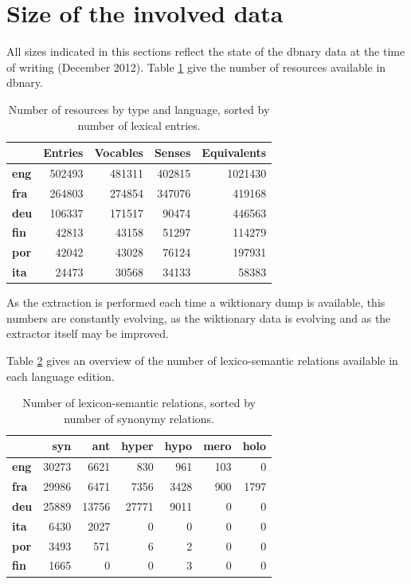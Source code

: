 \documentclass[sw]{iosart2c}
\begin{document}
\section{Size of the involved data}

All sizes indicated in this sections reflect the state of the dbnary data at the time of writing (December 2012). Table \ref{globalsize} give the number of resources available in dbnary.

\begin{table}[htb]
\begin{tabular}{lrrrr}
 & \textbf{Entries} & \textbf{Vocables} & \textbf{Senses} & \textbf{Equivalents}\\
 \hline
\textbf{eng} & 502493 & 481311 & 402815 & 1021430 \\
\textbf{fra} & 264803 & 274854 & 347076 & 419168 \\
\textbf{deu} & 106337 & 171517 & 90474 & 446563 \\
\textbf{fin} & 42813  & 43158 & 51297 & 114279 \\
\textbf{por} & 42042  & 43028 & 76124 & 197931 \\
\textbf{ita} & 24473  & 30568 & 34133 & 58383 \\
\end{tabular}
\caption{Number of resources by type and language, sorted by number of lexical entries.}\label{globalsize}
\end{table}

As the extraction is performed each time a wiktionary dump is available, this numbers are constantly evolving, as the wiktionary data is evolving and as the extractor itself may be improved.


Table \ref{nymsize} gives an overview of the number of lexico-semantic relations available in each language edition.

\begin{table}[htb]
\begin{tabular}{lrrrrrr}
 & \textbf{syn}  & \textbf{ant} & \textbf{hyper} & \textbf{hypo} & \textbf{mero} & \textbf{holo} \\
 \hline
\textbf{eng} & 30273& 6621& 830& 961& 103& 0 \\ 
\textbf{fra} & 29986& 6471& 7356& 3428& 900& 1797 \\ 
\textbf{deu} & 25889& 13756& 27771& 9011& 0& 0 \\ 
\textbf{ita} & 6430&  2027& 0& 0& 0& 0 \\ 
\textbf{por} & 3493&  571& 6& 2& 0& 0 \\ 
\textbf{fin} & 1665&  0& 0& 3& 0& 0 \\ 
\end{tabular}
\caption{Number of lexicon-semantic relations, sorted by number of synonymy relations.}\label{nymsize}
\end{table}
\end{document}
